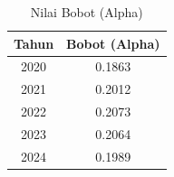 \begin{table}[H]
\centering
\caption{Nilai Bobot (Alpha)} \label{tab:alpha}
\begin{tabular}{|c|c|}
\hline
\textbf{Tahun} & \textbf{Bobot (Alpha)} \\
\hline
2020 & 0.1863 \\
2021 & 0.2012 \\
2022 & 0.2073 \\
2023 & 0.2064 \\
2024 & 0.1989 \\
\hline
\end{tabular}
\end{table}
